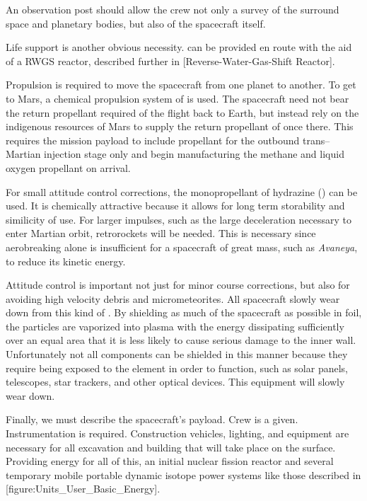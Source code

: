 An observation post should allow the crew not only a survey of the surround space and planetary bodies, but also of the spacecraft itself.

Life support is another obvious necessity.  can be provided en route with the aid of a RWGS reactor, described further in [Reverse-Water-Gas-Shift Reactor].

Propulsion is required to move the spacecraft from one planet to another. To get to Mars, a chemical propulsion system of  is used. The spacecraft need not bear the return propellant required of the flight back to Earth, but instead rely on the indigenous resources of Mars to supply the return propellant of  once there. This requires the mission payload to include propellant for the outbound trans--Martian injection stage only and begin manufacturing the methane and liquid oxygen propellant on arrival. 

For small attitude control corrections, the monopropellant of hydrazine () can be used. It is chemically attractive because it allows for long term storability and similicity of use. For larger impulses, such as the large deceleration necessary to enter Martian orbit, retrorockets will be needed. This is necessary since aerobreaking alone is insufficient for a spacecraft of great mass, such as {\it Avaneya}, to reduce its kinetic energy.

Attitude control is important not just for minor course corrections, but also for avoiding high velocity debris and micrometeorites. All spacecraft slowly wear down from this kind of . By shielding as much of the spacecraft as possible in foil, the particles are vaporized into plasma with the energy dissipating sufficiently over an equal area that it is less likely to cause serious damage to the inner wall. Unfortunately not all components can be shielded in this manner because they require being exposed to the element in order to function, such as solar panels, telescopes, star trackers, and other optical devices. This equipment will slowly wear down.

Finally, we must describe the spacecraft's payload. Crew is a given. Instrumentation is required. Construction vehicles, lighting, and equipment are necessary for all excavation and building that will take place on the surface. Providing energy for all of this, an initial nuclear fission reactor and several temporary mobile portable dynamic isotope power systems like those described in [figure:Units_User_Basic_Energy].

